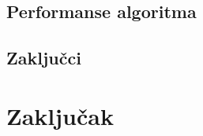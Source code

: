 \documentclass[12pt, a4paper]{article}
\begin{document}
\subsection{Performanse algoritma}



\subsection{Zaključci}



\newpage

\section{Zaključak}



\newpage



\end{document}
